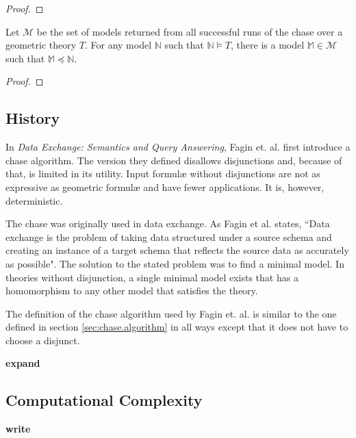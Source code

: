 		\begin{proof}
			
		\end{proof}

		\begin{theorem}
			Let $\mathcal{M}$ be the set of models returned from all successful
			runs of the chase over a geometric theory $T$. For any model
			$\mathbb{N}$ such that $\mathbb{N} \models T$, there is a model
			$\mathbb{M} \in \mathcal{M}$ such that $\mathbb{M} \preceq
			\mathbb{N}$.
		\end{theorem}

		\begin{proof}
			
		\end{proof}

	\subsection{History}

		In \cite{FKMP02} \emph{Data Exchange: Semantics and Query Answering},
		Fagin et. al. first introduce a chase algorithm. The version they
		defined disallows disjunctions and, because of that, is limited in its
		utility. Input formul{\ae} without disjunctions are not as expressive
		as geometric formul{\ae} and have fewer applications. It is, however,
		deterministic.

		The chase was originally used in data exchange. As Fagin et al. states,
		``Data exchange is the problem of taking data structured under a source
		schema and creating an instance of a target schema that reflects the
		source data as accurately as possible". The solution to the stated
		problem was to find a minimal model. In theories without disjunction, a
		single minimal model exists that has a homomorphism to any other model
		that satisfies the theory.

		The definition of the chase algorithm used by Fagin et. al. is
		similar to the one defined in section \ref{sec:chase.algorithm}
		in all ways except that it does not have to choose a disjunct.

		\textbf{ expand }

	\subsection{Computational Complexity}

		\textbf{ write }
